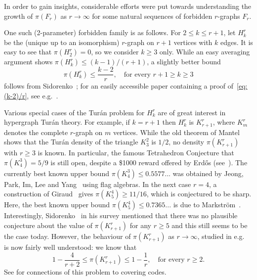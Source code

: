 \documentclass[12pt,a4paper]{article}
\numberwithin{equation}{section}
\theoremstyle{definition}
\theoremstyle{remark}
\begin{document}
In order to gain insights, considerable efforts were put towards understanding the growth of $\pi(F_r)$ as $r\to\infty$ for some natural sequences of forbidden $r$-graphs $F_r$. 

One such (2-parameter) forbidden family is as follows. For $2\le k\le r+1$, let $H_k^r$ be the (unique up to an isomorphism) $r$-graph on $r+1$ vertices with $k$ edges. It is easy to see that $\pi(H_2^r)=0$, so we consider $k\ge 3$ only. While an easy averaging argument shows $\pi(H_k^r)\le (k-1)/(r+1)$, a slightly better bound
\begin{equation}\label{eq:(k-2)/r}
	\pi(H_k^r)\le \frac{k-2}r,\quad \text{for every $r+1\ge k\ge 3$}
\end{equation}
follows from Sidorenko~\cite[Eq.~(7)]{Sidorenko82}; for an easily accessible paper containing a proof of~\eqref{eq:(k-2)/r}, see e.g.\ \cite[Corollary~3.9]{MarkstromThomassen21}.


Various special cases of the Tur\'an problem for $H_k^r$ are of great interest in hypergraph Tur\'an theory. For example, if $k=r+1$ then $H_k^r$ is $K_{r+1}^r$,  where $K_m^r$ denotes the complete $r$-graph on $m$ vertices. While the old theorem of Mantel~\cite{Mantel07} shows that the Tur\'an density of the triangle $K_3^2$ is $1/2$, no density $\pi(K_{r+1}^r)$ with $r\ge 3$ is known. In particular, the famous Tetrahedron Conjecture that $\pi(K_4^3)=5/9$ is still open, despite a \$1000 reward offered by Erd\H os (see~\cite[Page 260]{Furedi91}). The currently best known upper bound $\pi(K_4^3)\le 0.5577...$ was obtained by Jeong, Park, Im, Lee and Yang~\cite{JeongParkImLeeYang26x} using flag algebras.
In the next case $r=4$, a construction of Giraud~\cite{Giraud90} gives $\pi(K_5^4)\ge 11/16$, which is conjectured to be sharp. Here, the best known upper bound $\pi(K_5^4)\le 0.7365...$
is due to Markstr\"om~\cite{Markstrom09}. Interestingly,  Sidorenko~\cite{Sidorenko95} in his survey mentioned that there was no plausible conjecture about the value of $\pi(K_{r+1}^r)$ for any $r\ge 5$ and this still seems to be the case today. However, the behaviour of $\pi(K_{r+1}^r)$ as $r\to\infty$, studied in e.g.\ \cite{Sidorenko82,Decaen83ac,KimRoush83,TazawaShirakura83,FranklRodl85gc,Sidorenko97,ChungLu99,LuZhao09,Pikhurko25,GaoKuangPikhurkoWang26} is now fairly well understood: we know that 
$$
1-\frac{4}{r+2}\le \pi(K_{r+1}^r)\le 1-\frac1r,\quad\text{for every $r\ge2$}.
$$ 
See \cite{PikhurkoVerbitskyZhukovskii25,GaoKuangPikhurkoWang26} for connections of this problem to covering codes.
\end{document}
